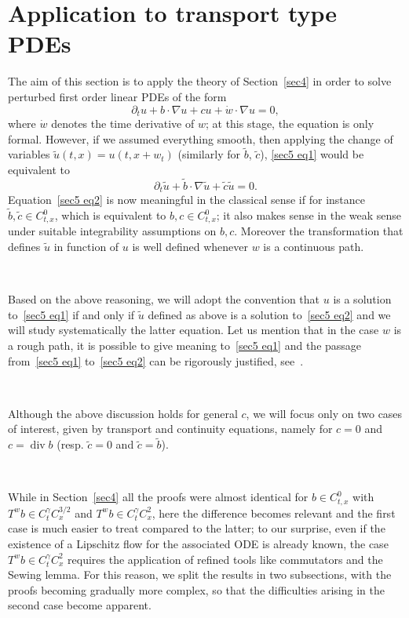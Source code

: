 \documentclass[10pt]{article}
\newcommand{\tmcolor}[2]{{\color{#1}{#2}}}
\newcommand{\tmop}[1]{\ensuremath{\operatorname{#1}}}
\begin{document}
\section{Application to transport type PDEs}\label{sec5}

\tmcolor{blue}{}The aim of this section is to apply the theory of
Section~\ref{sec4} in order to solve perturbed first order linear PDEs of the
form
\begin{equation}
  \partial_t u + b \cdot \nabla u + c u + \dot{w} \cdot \nabla u = 0,
  \label{sec5 eq1}
\end{equation}
where $\dot{w}$ denotes the time derivative of $w$; at this stage, the
equation is only formal. However, if we assumed everything smooth, then
applying the change of variables $\tilde{u} (t, x) = u (t, x + w_t)$
(similarly for $\tilde{b}$, $\tilde{c}$), {\eqref{sec5 eq1}} would be
equivalent to
\begin{equation}
  \partial_t \tilde{u} + \tilde{b} \cdot \nabla \tilde{u} + \tilde{c} 
  \tilde{u} = 0. \label{sec5 eq2}
\end{equation}
Equation~{\eqref{sec5 eq2}} is now meaningful in the classical sense if for
instance $\tilde{b}, \tilde{c} \in C^0_{t, x}$, which is equivalent to $b, c
\in C^0_{t, x}$; it also makes sense in the weak sense under suitable
integrability assumptions on $b, c$. Moreover the transformation that defines
$\tilde{u}$ in function of $u$ is well defined whenever $w$ is a continuous
path.

\

Based on the above reasoning, we will adopt the convention that $u$ is a
solution to~{\eqref{sec5 eq1}} if and only if $\tilde{u}$ defined as above is
a solution to~{\eqref{sec5 eq2}} and we will study systematically the latter
equation. Let us mention that in the case $w$ is a rough path, it is possible
to give meaning to~{\eqref{sec5 eq1}} and the passage from~{\eqref{sec5 eq1}}
to~{\eqref{sec5 eq2}} can be rigorously justified, see~{\cite{catellier}}.

\

Although the above discussion holds for general $c$, we will focus only on
two cases of interest, given by transport and continuity equations, namely for
$c = 0$ and $c = \tmop{div} b$ (resp. $\tilde{c} = 0$ and $\tilde{c} =
\tilde{b}$).

\

While in Section~\ref{sec4} all the proofs were almost identical for $b \in
C^0_{t, x}$ with $T^w b \in C^{\gamma}_t C^{3 / 2}_x$ and $T^w b \in
C^{\gamma}_t C^2_x$, here the difference becomes relevant and the first case
is much easier to treat compared to the latter; to our surprise, even if the
existence of a Lipschitz flow for the associated ODE is already known, the
case $T^w b \in C^{\gamma}_t C^2_x$ requires the application of refined tools
like commutators and the Sewing lemma. For this reason, we split the results
in two subsections, with the proofs becoming gradually more complex, so that
the difficulties arising in the second case become apparent.
\end{document}
